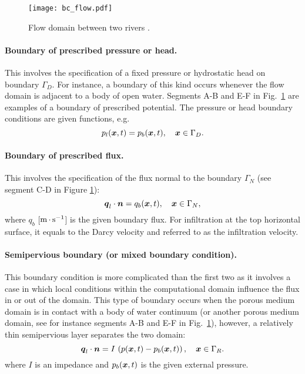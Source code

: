 \begin{figure}  [h]
\begin{center} 
\texttt{[image: bc\_flow.pdf]}
\caption{Flow domain between two rivers \citep[it was partially based on][Figure 5-7]{bear-1979}.}
\label{fig:bc_flow}
\end{center}
\end{figure}

\paragraph{Boundary of prescribed pressure or head.}
This involves the specification of a fixed pressure or hydrostatic head on boundary $\Gamma_D$.
For instance, a boundary of this kind occurs whenever the flow domain is adjacent to a body of open water.
Segments A-B and E-F in Fig.~\ref{fig:bc_flow} are examples of a boundary of prescribed potential.
The pressure or head boundary conditions are given functions, e.g.
\begin{equation}
  p_l({\boldsymbol{x}},t) = p_{b}({\boldsymbol{x}},t), \quad {\boldsymbol{x}} \in \Gamma_D. 
\end{equation}

\paragraph{Boundary of prescribed flux.}
This involves the specification of the flux normal to the boundary $\Gamma_N$
(see segment C-D in Figure \ref{fig:bc_flow}):
\begin{equation}
  {\boldsymbol{q}}_l\cdot \boldsymbol{n} = q_{b}({\boldsymbol{x}},t), \quad {\boldsymbol{x}} \in \Gamma_N,
\end{equation}
where $q_b$ [${\rm m}{\,\cdot\,}{\rm s}^{-1}$] is the given boundary flux. 
For infiltration at the top horizontal surface, it equals to the Darcy velocity
and referred to as the infiltration velocity.

\paragraph{Semipervious boundary (or mixed boundary condition).}
This boundary condition is more complicated than the first two as it involves a case 
in which local conditions within the computational domain influence the flux in or 
out of the domain.
This type of boundary occurs when the porous medium domain is in contact with 
a body of water continuum (or another porous medium domain, see for instance segments 
A-B and E-F in Fig.~\ref{fig:bc_flow}), however, a relatively thin semipervious layer 
separates the two domain:
\begin{equation}
  {\boldsymbol{q}}_l \cdot \boldsymbol{n} = I\, \left(p ({\boldsymbol{x}},t) - p_{b}({\boldsymbol{x}},t) \right), \quad {\boldsymbol{x}} \in \Gamma_R.
\end{equation}
where $I$ is an impedance and $p_{b}({\boldsymbol{x}},t)$ is the given external pressure.



